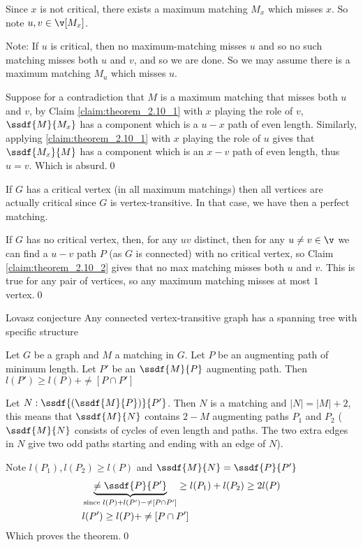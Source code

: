 \begin{prf}
\begin{prf}
\begin{itemize}
            Since $x$ is not critical, there exists a maximum matching $M_x$ which misses $x$. So note $u, v \in \v[M_x]$.

            Note: If $u$ is critical, then no maximum-matching misses $u$ and so no such matching misses both $u$ and $v$, and so we are done. So we may assume there is a maximum matching $M_u$ which misses $u$.

            Suppose for a contradiction that $M$ is a maximum matching that misses both $u$ and $v$, by Claim \ref{claim:theorem_2.10_1} with $x$ playing the role of $v$, $\ssdf{M}{M_x}$ has a component which is a $u - x$ path of even length. Similarly, applying \ref{claim:theorem_2.10_1} with $x$ playing the role of $u$ gives that $\ssdf{M_x}{M}$ has a component which is an $x - v$ path of even length, thus $u = v$. Which is absurd.\qed
        \end{itemize}
    \end{prf}
    If $G$ has a critical vertex (in all maximum matchings) then all vertices are actually critical since $G$ is vertex-transitive. In that case, we have then a perfect matching.

    If $G$ has no critical vertex, then, for any $uv$ distinct, then for any $u \neq v \in \v$ we can find a $u - v$ path $P$ (as $G$ is connected) with no critical vertex, so Claim \ref{claim:theorem_2.10_2} gives that no max matching misses both $u$ and $v$. This is true for any pair of vertices, so any maximum matching misses at most $1$ vertex.\qed
\end{prf}
\begin{customtheorem}{Lovasz conjecture}
\label{theorem:lovasz}
    Any connected vertex-transitive graph has a spanning tree with specific structure
\end{customtheorem}
\begin{customlemma}{2.12}
\label{lemma:2.12}
    Let $G$ be a graph and $M$ a matching in $G$. Let $P$ be an augmenting path of minimum length. Let $P'$ be an $\ssdf{M}{P}$ augmenting path. Then $l(P') \geq l(P) + \ne[P \cap P']$
\end{customlemma}
\begin{prf}
    Let $N: \ssdf{(\ssdf{M}{P})}{P'}$. Then $N$ is a matching and $|N| = |M| + 2$, this means that $\ssdf{M}{N}$ contains $2 - M$ augmenting paths $P_1$ and $P_2$ ($\ssdf{M}{N}$ consists of cycles of even length and paths. The two extra edges in $N$ give two odd paths starting and ending with an edge of $N$).

    Note $l(P_1), l(P_2) \geq l(P)$ and $\ssdf{M}{N} = \ssdf{P}{P'}$
    \begin{align*}
        &\underbrace{\ne{\ssdf{P}{P'}}}_{\text{since }l(P) + l(P') - \ne[P \cap P']} \geq l(P_1) + l(P_2) \geq 2l(P)\\
        &l(P') \geq l(P) + \ne[P \cap P']
    \end{align*}
    Which proves the theorem.\qed
\end{prf}
